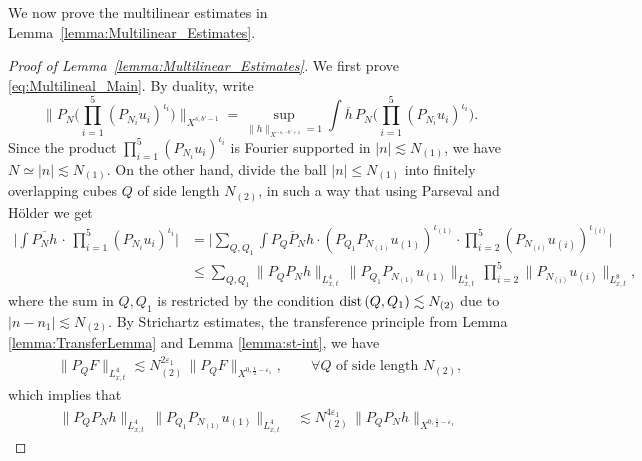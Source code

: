 \documentclass[11pt, xcolor = dvipsnames,reqno
]{amsart}
\theoremstyle{definition}
\theoremstyle{remark}
\newcommand{\dist} {\text{dist\! }}
\begin{document}
We now prove the multilinear estimates in Lemma~\ref{lemma:Multilinear_Estimates}.
\begin{proof}[Proof of Lemma~\ref{lemma:Multilinear_Estimates}]
    We first prove \eqref{eq:Multilineal_Main}. By duality, write 
    \begin{equation}\label{eq:dual-norm}
        \bigg\lVert P_N \bigg(
        \prod_{i=1}^5 (P_{N_{i}} u_i)^{\iota_i} \bigg)
        \bigg\rVert_{X^{s, b'-1}} 
        = \sup_{\lVert h \rVert_{X^{-s, -b'+1}} = 1} 
        \int \overline{h} \, P_N \bigg( \prod_{i=1}^5 (P_{N_{i}} u_i)^{\iota_i} \bigg).
    \end{equation}  
    Since the product $\prod_{i=1}^5 (P_{N_{i}} u_i)^{\iota_i}$ is Fourier supported in $|n| \lesssim N_{(1)}$, 
    we have $N \simeq |n| \lesssim N_{(1)}$. 
    On the other hand,
    divide the ball $|n| \leq N_{(1)}$ into finitely overlapping cubes $Q$ of side length $N_{(2)}$,  
    in such a way that using Parseval and H\"older we get
    \begin{align}
        \Big| \int \overline{P_N h} \, \cdot \, \prod_{i=1}^5 (P_{N_i} u_i)^{\iota_i} \Big|
        & = \Big| \sum_{Q, Q_1} 
        \int \overline{P_Q P_N h} \cdot 
        (P_{Q_1}P_{N_{(1)}} u_{(1)})^{\iota_{(1)}}
        \cdot \prod_{i=2}^5 (P_{N_{(i)}} u_{(i)})^{\iota_{(i)}} \Big| \\
        & \leq 
        \sum_{Q, Q_1}
        \lVert P_Q P_N h \rVert_{L^4_{x,t}} \,
        \big\lVert  P_{Q_1} P_{N_{(1)}} u_{(1)} \big\rVert_{L^4_{x,t}} \, 
        \prod_{i=2}^5 \big\lVert  P_{N_{(i)}} u_{(i)} \big\rVert_{L^8_{x,t}},
    \end{align} 
    where the sum in $Q,Q_1$ is restricted by the condition $\dist(Q, Q_1) \lesssim N_{(2)}$ due to $|n-n_1| \lesssim N_{(2)}$. 
    By Strichartz estimates, the transference principle from Lemma \ref{lemma:TransferLemma}
    and Lemma \ref{lemma:st-int}, we have 
    \begin{align}\label{eq:Strichartz_Localized}
        \|P_Q F\|_{L^4_{x,t}}
        \lesssim 
        N_{(2)}^{2\varepsilon_1} \, \| P_Q F \|_{X^{0, \frac{1}{2} - \varepsilon_1}},
        \qquad \forall Q \text{ of side length } N_{(2)}, 
    \end{align}
    which implies that
    \begin{align}\label{eq:Multilinear_Proof_Xsb}
        \lVert  P_Q P_N  h \rVert_{L^4_{x,t}}\, 
        \big\lVert  P_{Q_1} P_{N_{(1)}} u_{(1)} \big\rVert_{L^4_{x,t}}
        & \lesssim 
        N_{(2)}^{4\varepsilon_1} \, 
        \lVert P_Q P_N  h \rVert_{X^{0, \frac{1}{2} - \varepsilon_1}} \, 

\end{align}
\end{proof}
\end{document}
